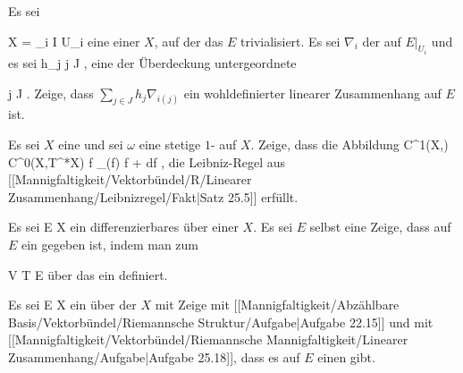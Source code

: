 {}
{

Es sei

\mavergleichskette
{\vergleichskette
{ X
}
{ = }{ \bigcup_{i \in I} U_i
}
{  }{
}
{    }{
}
{   }{
}
}
{}{}{}
eine
einer
$X$, auf der das
$E$ trivialisiert. Es sei  $\nabla_i$ der
auf $E\vert_{U_i }$ und es sei
\mathkor {} {h_j} {} {j \in J} {,}
eine der Überdeckung untergeordnete

 {}
 {j \in J} {}
 {} {} {} {.}
Zeige, dass $\sum_{j \in J} h_j \nabla_{i(j)}$ ein wohldefinierter linearer Zusammenhang auf $E$ ist.

}
{} {}

{}
{

Es sei $X$ eine
und sei $\omega$ eine stetige
$1$-
auf $X$. Zeige, dass die Abbildung
\maabbeledisp {} {C^1(X,\R)} { C^0(X,T^*X)
} { f } { \nabla_\omega (f)  f \omega + df
} {,}
die Leibniz-Regel aus
[[Mannigfaltigkeit/Vektorbündel/R/Linearer Zusammenhang/Leibnizregel/Fakt|Satz 25.5]]
erfüllt.

}
{} {}

{}
{

Es sei
 { E } { X
} {}
ein differenzierbares
über einer
$X$. Es sei $E$ selbst eine
Zeige, dass auf $E$ ein
gegeben ist, indem man zum

\mavergleichskette
{\vergleichskette
{ V
}
{ \subseteq }{ T E
}
{  }{
}
{    }{
}
{   }{
}
}
{}{}{}
über das
ein
definiert.

}
{} {}

{}
{

Es sei
 { E } { X
} {}
ein
über der
$X$ mit
Zeige mit
[[Mannigfaltigkeit/Abzählbare Basis/Vektorbündel/Riemannsche Struktur/Aufgabe|Aufgabe 22.15]]
und mit
[[Mannigfaltigkeit/Vektorbündel/Riemannsche Mannigfaltigkeit/Linearer Zusammenhang/Aufgabe|Aufgabe 25.18]],
dass es auf $E$ einen
gibt.

}
{} {}

